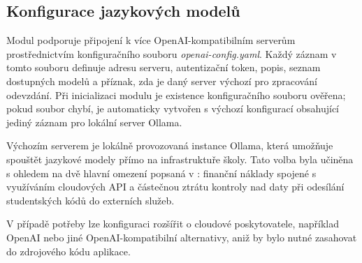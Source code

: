 \subsection{Konfigurace jazykových modelů}
\label{subsec:implementation-config}

Modul podporuje připojení k více OpenAI-kompatibilním serverům prostřednictvím konfiguračního souboru \textit{openai-config.yaml}.
Každý záznam v tomto souboru definuje adresu serveru, autentizační token, popis, seznam dostupných modelů a příznak, zda je daný server výchozí pro zpracování odevzdání.
Při inicializaci modulu je existence konfiguračního souboru ověřena; pokud soubor chybí, je automaticky vytvořen s výchozí konfigurací obsahující jediný záznam pro lokální server Ollama\@.

Výchozím serverem je lokálně provozovaná instance Ollama, která umožňuje spouštět jazykové modely přímo na infrastruktuře školy.
Tato volba byla učiněna s ohledem na dvě hlavní omezení popsaná v : finanční náklady spojené s využíváním cloudových API a částečnou ztrátu kontroly nad daty při odesílání studentských kódů do externích služeb.

V případě potřeby lze konfiguraci rozšířit o cloudové poskytovatele, například OpenAI nebo jiné OpenAI-kompatibilní alternativy, aniž by bylo nutné zasahovat do zdrojového kódu aplikace.

\endinput